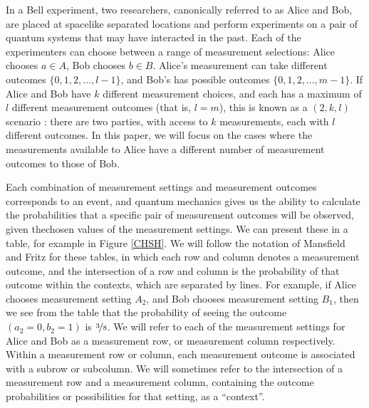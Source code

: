 \documentclass[reprint]{revtex4-1}
\theoremstyle{definition}
\begin{document}
In a Bell experiment, two researchers, canonically referred to as Alice and Bob, are placed at spacelike separated locations and perform experiments on a pair of quantum systems that may have interacted in the past. Each of the experimenters can choose between a range of measurement selections: Alice chooses $a\in A$, Bob chooses $b\in B$. Alice's measurement can take different outcomes $\{0,1,2,\dots,l-1\}$, and Bob's has possible outcomes $\{0,1,2,\dots,m-1\}$. If Alice and Bob have $k$ different measurement choices, and each has a maximum of $l$ different measurement outcomes (that is, $l=m$), this is known as a $(2,k,l)$ scenario \cite{Mans2011,Abra2013}: there are two parties, with access to $k$ measurements, each with $l$ different outcomes. In this paper, we will focus on the cases where the measurements available to Alice have a different number of measurement outcomes to those of Bob.

Each combination of measurement settings and measurement outcomes corresponds to an event, and quantum mechanics gives us the ability to calculate the probabilities that a specific pair of measurement outcomes will be observed, given thechosen values of the measurement settings. We can present these in a table, for example in Figure \ref{CHSH}. We will follow the notation of Mansfield and Fritz for these tables, in which each row and column denotes a measurement outcome, and the intersection of a row and column is the probability of that outcome within the contexts, which are separated by lines.  For example, if Alice chooses measurement setting $A_2$, and Bob chooses measurement setting $B_1$, then we see from the table that the probability of seeing the outcome $(a_2=0, b_2=1)$ is $\nicefrac38$. We will refer to each of the measurement settings for Alice and Bob as a measurement row, or measurement column respectively. Within a measurement row or column, each measurement outcome is associated with a subrow or subcolumn. We will sometimes refer to the intersection of a measurement row and a measurement column, containing the outcome probabilities or possibilities for that setting, as a ``context''.
\end{document}
